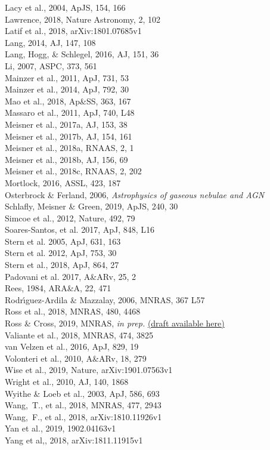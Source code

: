 \documentclass[12pt]{article}
\begin{document}
Lacy et al., 2004, ApJS, 154, 166 \\
Lawrence, 2018, Nature Astronomy, 2, 102 \\
Latif et al., 2018, arXiv:1801.07685v1 \\
Lang, 2014, AJ, 147, 108	\\
Lang, Hogg, \& Schlegel, 2016, AJ, 151, 36 \\
Li, 2007, ASPC, 373, 561\\
Mainzer et al., 2011, ApJ, 731, 53 \\
Mainzer et al., 2014, ApJ, 792, 30 \\
Mao et al., 2018,  Ap\&SS, 363, 167\\   %
Massaro et al., 2011, ApJ, 740, L48 \\ %
Meisner et al., 2017a, AJ, 153, 38 \\    
Meisner et al., 2017b, AJ, 154, 161 \\
Meisner et al., 2018a, RNAAS, 2, 1 \\
Meisner et al., 2018b, AJ, 156, 69 \\
Meisner et al., 2018c, RNAAS, 2, 202 \\
Mortlock, 2016, ASSL, 423, 187 \\
Osterbrock \& Ferland, 2006, {\it Astrophysics of gaseous nebulae and AGN}   \\ %
Schlafly,  Meisner  \& Green, 2019, ApJS, 240, 30 \\
Simcoe et al., 2012, Nature, 492, 79 \\
Soares-Santos, et al. 2017, ApJ, 848, L16	\\
Stern et al. 2005, ApJ, 631, 163 \\
Stern et al. 2012,  ApJ, 753, 30 \\  %
Stern et al., 2018, ApJ, 864, 27 \\
Padovani et al. 2017, A\&ARv, 25, 2 \\
Rees, 1984, ARA\&A, 22, 471 \\
Rodr{\'{\i}}guez-Ardila \& Mazzalay, 2006, MNRAS, 367 L57 \\
Ross et al., 2018, MNRAS, 480, 4468 \\
Ross \& Cross, 2019, MNRAS, {\it in prep.} \href{https://github.com/d80b2t/VHzQ}{(draft available here)} \\
Valiante et al., 2018, MNRAS,  474, 3825 \\
van Velzen et al., 2016, ApJ, 829, 19 \\
Volonteri  et al., 2010, A\&ARv, 18, 279 \\
Wise et al., 2019, Nature,  arXiv:1901.07563v1 \\
Wright et al., 2010, AJ, 140, 1868 \\
Wyithe \& Loeb et al., 2003, ApJ, 586, 693 \\
Wang,~T., et al., 2018, MNRAS, 477, 2943 \\
Wang,~F., et al., 2018,  arXiv:1810.11926v1 \\
Yan et al., 2019, 1902.04163v1 \\
Yang et al,, 2018, arXiv:1811.11915v1 \\

\end{document}
